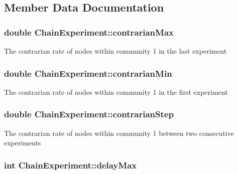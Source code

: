 \subsection{Member Data Documentation}
\hypertarget{class_chain_experiment_a02ea31bc14bc89d32fba19ed3439ad3f}{
\subsubsection[{contrarian\-Max}]{\setlength{\rightskip}{0pt plus 5cm}double Chain\-Experiment\-::contrarian\-Max}}\label{class_chain_experiment_a02ea31bc14bc89d32fba19ed3439ad3f}
The contrarian rate of nodes within community 1 in the last experiment \hypertarget{class_chain_experiment_a343f957d771934c6bada7613c020c07f}{
\subsubsection[{contrarian\-Min}]{\setlength{\rightskip}{0pt plus 5cm}double Chain\-Experiment\-::contrarian\-Min}}\label{class_chain_experiment_a343f957d771934c6bada7613c020c07f}
The contrarian rate of nodes within community 1 in the first experiment \hypertarget{class_chain_experiment_a072bef3805353ee08e7ac3b8e4d8d69b}{
\subsubsection[{contrarian\-Step}]{\setlength{\rightskip}{0pt plus 5cm}double Chain\-Experiment\-::contrarian\-Step}}\label{class_chain_experiment_a072bef3805353ee08e7ac3b8e4d8d69b}
The contrarian rate of nodes within community 1 between two consecutive experiments \hypertarget{class_chain_experiment_aece190c28fdde383004c31a75be5166a}{
\subsubsection[{delay\-Max}]{\setlength{\rightskip}{0pt plus 5cm}int Chain\-Experiment\-::delay\-Max}}\label{class_chain_experiment_aece190c28fdde383004c31a75be5166a}
